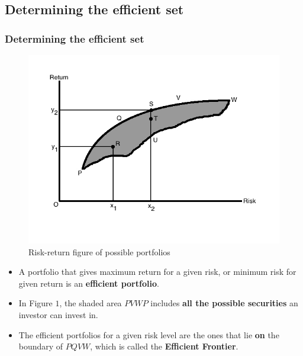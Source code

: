 \documentclass{beamer}
\begin{document}
\subsection{Determining the efficient set}

\begin{frame}
\frametitle{\textbf{Determining the efficient set}}

\begin{figure}
	\centering
	\includegraphics[scale = 0.25]{fig1.jpg}
	\vskip -1cm
	\caption{Risk-return figure of possible portfolios}
	\label{fig:fig1}
\end{figure}

\vskip -0.2cm
\justifying
\begin{itemize}
	\justifying
	\item A portfolio that gives maximum return for a given risk, or minimum risk for given return is an \textbf{efficient portfolio}.
	\item In Figure $1$, the shaded area $PVWP$ includes \textbf{all the possible securities} an investor can invest in.
	\item The efficient portfolios for a given risk level are the ones that lie \textbf{on} the boundary of $PQVW$, which is called the \textbf{Efficient Frontier}.
\end{itemize}

\end{frame}
\end{document}

